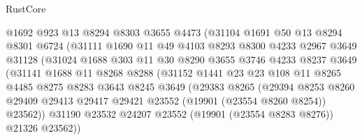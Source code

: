 \begin{lexlean}{RustCore}
\begin{coremodule}
                      @1692
                      @923
                      @13
                      @8294
                      @8303
                      @3655
                      @4473
                      (@31104
                        @1691
                        @50
                        @13
                        @8294
                        @8301
                        @6724
                        (@31111
                          @1690
                          @11
                          @49
                          @4103
                          @8293
                          @8300
                          @4233
                          @2967
                          @3649
                          @31128
                          (@31024
                            @1688
                            @303
                            @11
                            @30
                            @8290
                            @3655
                            @3746
                            @4233
                            @8237
                            @3649
                            (@31141
                              @1688
                              @11
                              @8268
                              @8288
                              (@31152
                                @1441
                                @23
                                @23
                                @108
                                @11
                                @8265
                                @4485
                                @8275
                                @8283
                                @3643
                                @8245
                                @3649
                                (@29383
                                  @8265
                                  (@29394
                                    @8253
                                    @8260
                                    @29409
                                    @29413
                                    @29417
                                    @29421
                                    @23552
                                    (@19901 (@23554 @8260 @8254))
                                    @23562))
                                @31190
                                @23532
                                @24207
                                @23552
                                (@19901 (@23554 @8283 @8276))
                                @21326
                                @23562))

\end{coremodule}
\end{lexlean}
